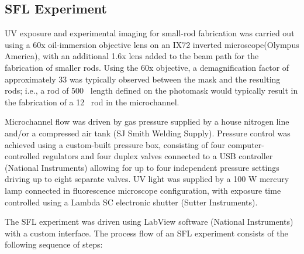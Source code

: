 \subsection{SFL Experiment}
\label{sec:sfl-expt-rods}




UV exposure and experimental imaging for small-rod fabrication was carried out using a 60x 
oil-immersion objective lens 
on an IX72 inverted microscope(Olympus America), with an additional 1.6x lens added to the beam path for
the fabrication of smaller rods.  Using the 60x objective, a demagnification factor of approximately 
33 was typically observed between the mask and the resulting rods; i.e., a rod of 500 \microns~length defined on
the photomask would typically result in the fabrication of a 12 \microns~rod in the microchannel.

Microchannel flow was driven by gas pressure supplied by a house nitrogen line and/or a compressed air tank 
(SJ Smith Welding Supply). Pressure control was achieved using a custom-built pressure box, consisting of
four computer-controlled regulators and four duplex valves connected to a USB
controller (National Instruments) allowing for 
up to four independent pressure
settings driving up to eight separate valves. UV light was supplied by a 100 W mercury lamp
connected in fluorescence microscope configuration, with exposure time controlled using a Lambda SC 
electronic shutter (Sutter Instruments).

The SFL experiment was driven using LabView software (National Instruments) with a custom
interface. The process
flow of an SFL experiment consists of the following sequence of steps:

